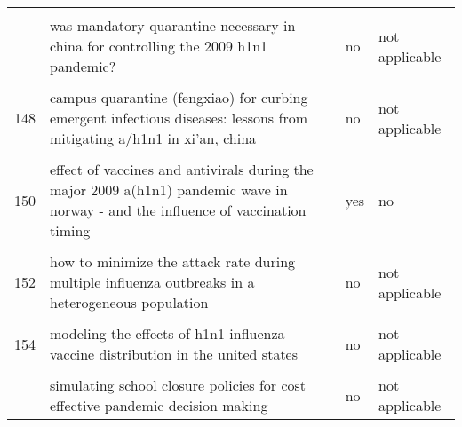 \documentclass[
]{article}
\begin{document}
\begin{landscape}
\begin{longtable}{l>{\raggedright\arraybackslash}p{4cm}l>{\raggedright\arraybackslash}p{4cm}}
\cellcolor{gray!6}{145} & \cellcolor{gray!6}{vaccination against foot-and-mouth disease: do initial conditions affect its benefit?} & \cellcolor{gray!6}{no} & \cellcolor{gray!6}{not applicable}\\
\addlinespace
146 & was mandatory quarantine necessary in china for controlling the 2009 h1n1 pandemic? & no & not applicable\\
\cellcolor{gray!6}{147} & \cellcolor{gray!6}{a contact-network-based simulation model for evaluating interventions under 'what-if' scenarios in epidemic} & \cellcolor{gray!6}{no} & \cellcolor{gray!6}{not applicable}\\
148 & campus quarantine (fengxiao) for curbing emergent infectious diseases: lessons from mitigating a/h1n1 in xi'an, china & no & not applicable\\
\cellcolor{gray!6}{149} & \cellcolor{gray!6}{dynamic modelling of costs and health consequences of school closure during an influenza pandemic} & \cellcolor{gray!6}{no} & \cellcolor{gray!6}{not applicable}\\
150 & effect of vaccines and antivirals during the major 2009 a(h1n1) pandemic wave in norway - and the influence of vaccination timing & yes & no\\
\addlinespace
\cellcolor{gray!6}{151} & \cellcolor{gray!6}{estimating the value of containment strategies in delaying the arrival time of an influenza pandemic: a case study of travel restriction and patient isolation} & \cellcolor{gray!6}{no} & \cellcolor{gray!6}{not applicable}\\
152 & how to minimize the attack rate during multiple influenza outbreaks in a heterogeneous population & no & not applicable\\
\cellcolor{gray!6}{153} & \cellcolor{gray!6}{modeling strategies for controlling h1n1 outbreaks in china} & \cellcolor{gray!6}{no} & \cellcolor{gray!6}{not applicable}\\
154 & modeling the effects of h1n1 influenza vaccine distribution in the united states & no & not applicable\\
\cellcolor{gray!6}{155} & \cellcolor{gray!6}{modeling the impact of air, sea, and land travel restrictions supplemented by other interventions on the emergence of a new influenza pandemic virus} & \cellcolor{gray!6}{no} & \cellcolor{gray!6}{not applicable}\\
\addlinespace
156 & simulating school closure policies for cost effective pandemic decision making & no & not applicable\\

\end{longtable}
\end{landscape}
\end{document}
